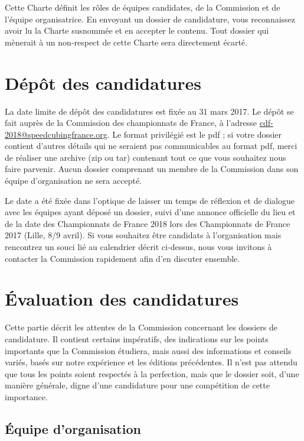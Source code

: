\documentclass[a4paper,12pt]{scrartcl}
\begin{document}
Cette Charte définit les rôles de équipes candidates, de la Commission et de l'équipe organisatrice. En envoyant un dossier de candidature, vous reconnaissez avoir lu la Charte susnommée et en accepter le contenu. Tout dossier qui mènerait à un non-respect de cette Charte sera directement écarté.


\section*{Dépôt des candidatures}

La date limite de dépôt des candidatures est fixée au 31 mars 2017. Le dépôt se fait auprès de la Commission des championnats de France, à l'adresse \href{mailto:cdf-2018@speedcubingfrance.org}{cdf-2018@speedcubingfrance.org}.
Le format privilégié est le pdf ; si votre dossier contient d'autres détails qui ne seraient pas communicables au format pdf, merci de réaliser une archive (zip ou tar) contenant tout ce que vous souhaitez nous faire parvenir. Aucun dossier comprenant un membre de la Commission dans son équipe d'organisation ne sera accepté.

Le date a été fixée dans l'optique de laisser un temps de réflexion et de dialogue avec les équipes ayant déposé un dossier, suivi d'une annonce officielle du lieu et de la date des Championnats de France 2018 lors des Championnats de France 2017 (Lille, 8/9 avril). Si vous souhaitez être candidats à l'organisation mais rencontrez un souci lié au calendrier décrit ci-dessus, nous vous invitons à contacter la Commission rapidement afin d'en discuter ensemble.

\pagebreak
\section*{Évaluation des candidatures}

Cette partie décrit les attentes de la Commission concernant les dossiers de candidature. Il contient certains impératifs, des indications sur les points importants que la Commission étudiera, mais aussi des informations et conseils variés, basés sur notre expérience et les éditions précédentes. Il n'est pas attendu que tous les points soient respectés à la perfection, mais que le dossier soit, d'une manière générale, digne d'une candidature pour une compétition de cette importance.


\subsection*{Équipe d'organisation}
\end{document}
